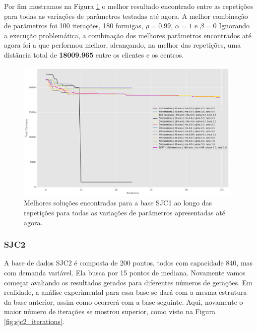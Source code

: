 Por fim mostramos na Figura \ref{fig:sjc1_best} o melhor resultado encontrado entre as repetições para todas as variações de parâmetros testadas até agora. A melhor combinação de parâmetros foi 100 iterações, 180 formigas, $\rho = 0.99$, $\alpha=1$ e $\beta=0$ Ignorando a execução problemática, a combinação dos melhores parâmetros encontrados até agora foi a que performou melhor, alcançando, na melhor das repetições, uma distância total de \textbf{18009.965} entre os clientes e os centros. 

\begin{figure}[h]	
  \centering
  \includegraphics[width=11cm,keepaspectratio]{images/SJC1_best.png}
  \caption{Melhores soluções encontradas para a base SJC1 ao longo das repetições para todas as variações de parâmetros apresentadas até agora.}
  \label{fig:sjc1_best}
\end{figure}



\subsubsection{SJC2}

A base de dados SJC2 é composta de 200 pontos, todos com capacidade 840, mas com demanda variável. Ela busca por 15 pontos de mediana. Novamente vamos começar avaliando os resultados gerados para diferentes números de gerações. Em realidade, a análise experimental para essa base se dará com a mesma estrutura da base anterior, assim como ocorrerá com a base seguinte. Aqui, novamente o maior número de iterações se mostrou superior, como visto na Figura \ref{fig:sjc2_iterations}.

